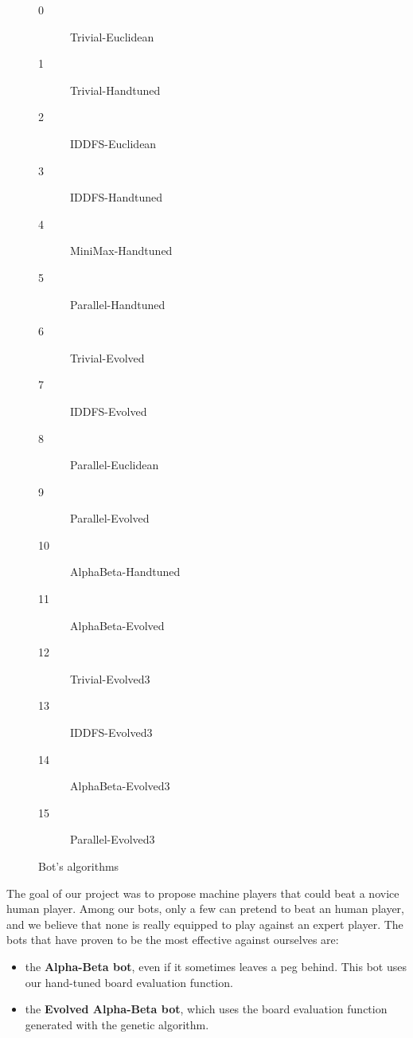\begin{figure}
\centering

\begin{description}
    \item [0] Trivial-Euclidean
    \item [1] Trivial-Handtuned
    \item [2] IDDFS-Euclidean
    \item [3] IDDFS-Handtuned
    \item [4] MiniMax-Handtuned
    \item [5] Parallel-Handtuned
    \item [6] Trivial-Evolved
    \item [7] IDDFS-Evolved
    \item [8] Parallel-Euclidean
    \item [9] Parallel-Evolved
    \item [10] AlphaBeta-Handtuned
    \item [11] AlphaBeta-Evolved
    \item [12] Trivial-Evolved3
    \item [13] IDDFS-Evolved3
    \item [14] AlphaBeta-Evolved3
    \item [15] Parallel-Evolved3
\end{description}
\caption{Bot's algorithms}
\label{botid}
\end{figure}




The goal of our project was to propose machine players that could beat
a novice human player. Among our bots, only a few can pretend to beat
an human player, and we believe that none is really equipped to play
against an expert player. The bots that have proven to be the most
effective against ourselves are:

\begin{itemize}
  \item the \textbf{Alpha-Beta bot}, even if it sometimes leaves a peg behind.
        This bot uses our hand-tuned board evaluation function.
  \item the \textbf{Evolved Alpha-Beta bot}, which uses the board evaluation
        function generated with the genetic algorithm.
\end{itemize}

